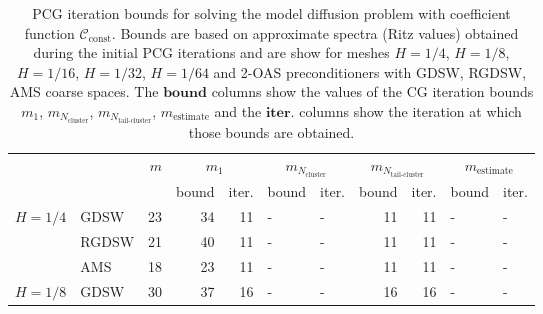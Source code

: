 \begin{table}[H]
\centering
\caption{PCG iteration bounds for solving the model diffusion problem with coefficient function $\mathcal{C}_{\mathrm{const}}$. Bounds are based on approximate spectra (Ritz values) obtained during the initial PCG iterations and are show for meshes $H=1/4$, $H=1/8$, $H=1/16$, $H=1/32$, $H=1/64$ and 2-OAS preconditioners with GDSW, RGDSW, AMS coarse spaces. The $\textbf{bound}$ columns show the values of the CG iteration bounds $m_1$, $m_{N_{\text{cluster}}}$, $m_{N_{\text{tail-cluster}}}$, $m_{\text{estimate}}$ and the $\textbf{iter.}$ columns show the iteration at which those bounds are obtained.}
\label{tab:cg_iteration_bound_coef=const}
\begin{tabular}{llrrrllrrll}
\toprule
 &  & \bfseries $m$ & \multicolumn{2}{|c|}{\bfseries $m_1$} & \multicolumn{2}{|c|}{\bfseries $m_{N_{\text{cluster}}}$} & \multicolumn{2}{|c|}{\bfseries $m_{N_{\text{tail-cluster}}}$} & \multicolumn{2}{|c|}{\bfseries $m_{\text{estimate}}$} \\
 &  &  & bound & iter. & bound & iter. & bound & iter. & bound & iter. \\
\midrule
\multirow[c]{3}{*}{\bfseries $H=1/4$} & GDSW & 23 & {\cellcolor[HTML]{405FE5}} \color[HTML]{F1F1F1} 34 & 11 & {\cellcolor[HTML]{ACB8F4}} \color[HTML]{000000} {\cellcolor[HTML]{E2E4FB}} - & - & {\cellcolor[HTML]{768BEC}} \color[HTML]{F1F1F1} 11 & 11 & {\cellcolor[HTML]{E2E4FB}} \color[HTML]{000000} {\cellcolor[HTML]{E2E4FB}} - & - \\
\cline{2-11}
\bfseries  & RGDSW & 21 & {\cellcolor[HTML]{768BEC}} \color[HTML]{F1F1F1} 40 & 11 & {\cellcolor[HTML]{ACB8F4}} \color[HTML]{000000} {\cellcolor[HTML]{E2E4FB}} - & - & {\cellcolor[HTML]{405FE5}} \color[HTML]{F1F1F1} 11 & 11 & {\cellcolor[HTML]{E2E4FB}} \color[HTML]{000000} {\cellcolor[HTML]{E2E4FB}} - & - \\
\cline{2-11}
\bfseries  & AMS & 18 & {\cellcolor[HTML]{405FE5}} \color[HTML]{F1F1F1} 23 & 11 & {\cellcolor[HTML]{ACB8F4}} \color[HTML]{000000} {\cellcolor[HTML]{E2E4FB}} - & - & {\cellcolor[HTML]{768BEC}} \color[HTML]{F1F1F1} 11 & 11 & {\cellcolor[HTML]{E2E4FB}} \color[HTML]{000000} {\cellcolor[HTML]{E2E4FB}} - & - \\
\cline{1-11} \cline{2-11}
\multirow[c]{3}{*}{\bfseries $H=1/8$} & GDSW & 30 & {\cellcolor[HTML]{405FE5}} \color[HTML]{F1F1F1} 37 & 16 & {\cellcolor[HTML]{ACB8F4}} \color[HTML]{000000} {\cellcolor[HTML]{E2E4FB}} - & - & {\cellcolor[HTML]{768BEC}} \color[HTML]{F1F1F1} 16 & 16 & {\cellcolor[HTML]{E2E4FB}} \color[HTML]{000000} {\cellcolor[HTML]{E2E4FB}} - & - \\

\end{tabular}
\end{table}

